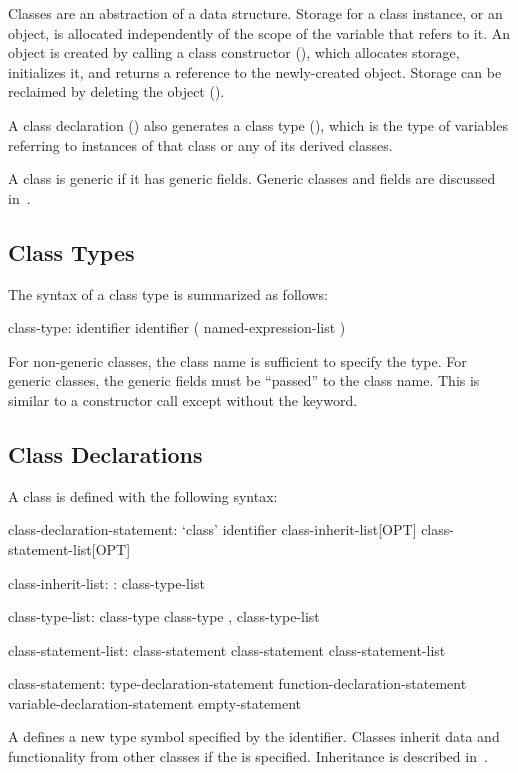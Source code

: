 \label{Classes}

Classes are an abstraction of a data structure. Storage for
a class instance, or an object, is allocated independently of the scope of
the variable that refers to it.
An object is created by calling a class constructor
(), which allocates storage, initializes it,
and returns a reference to the newly-created object.
Storage can be reclaimed by deleting the object ().

A class declaration () also generates a class
type (), which is the type of variables referring to
instances of that class or any of its derived classes.

A class is generic if it has generic fields. Generic classes and fields
are discussed in~.

\subsection{Class Types}
\label{Class_Types}

The syntax of a class type is summarized as follows:
\begin{syntax}
class-type:
  identifier
  identifier ( named-expression-list )
\end{syntax}
For non-generic classes, the class name is sufficient to specify the
type.  For generic classes, the generic fields must be ``passed'' to
the class name.  This is similar to a constructor call except without
the  keyword.

\subsection{Class Declarations}
\label{Class_Declarations}

A class is defined with the following syntax:
\begin{syntax}
class-declaration-statement:
  `class' identifier class-inherit-list[OPT] {
    class-statement-list[OPT] }

class-inherit-list:
  : class-type-list

class-type-list:
  class-type
  class-type , class-type-list

class-statement-list:
  class-statement
  class-statement class-statement-list

class-statement:
  type-declaration-statement
  function-declaration-statement
  variable-declaration-statement
  empty-statement
\end{syntax}
A  defines a new type symbol
specified by the identifier.  Classes inherit data and functionality
from other classes if the  is specified.
Inheritance is described in~.

